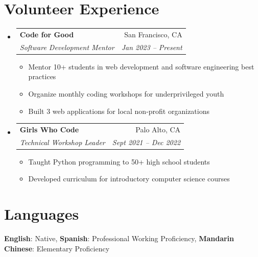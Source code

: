 \documentclass[letterpaper,11pt]{article}
\makeatletter
\newcommand{\resumeItem}[1]{
  \item\small{
    {#1 \vspace{-2pt}}
  }
}
\newcommand{\resumeSubheading}[4]{
  \vspace{-2pt}\item
    \begin{tabular*}{0.97\textwidth}[t]{l@{\extracolsep{\fill}}r}
      \textbf{#1} & #2 \\
      \textit{\small#3} & \textit{\small #4} \\
    \end{tabular*}\vspace{-7pt}
}
\newcommand{\resumeSubHeadingListStart}{\begin{itemize}[leftmargin=0.15in, label={}]}
\newcommand{\resumeSubHeadingListEnd}{\end{itemize}}
\newcommand{\resumeItemListStart}{\begin{itemize}}
\newcommand{\resumeItemListEnd}{\end{itemize}\vspace{-5pt}}
\makeatother
\begin{document}
\section{Volunteer Experience}
  \resumeSubHeadingListStart
    \resumeSubheading
      {Code for Good}{San Francisco, CA}
      {Software Development Mentor}{Jan 2023 -- Present}
      \resumeItemListStart
        \resumeItem{Mentor 10+ students in web development and software engineering best practices}
        \resumeItem{Organize monthly coding workshops for underprivileged youth}
        \resumeItem{Built 3 web applications for local non-profit organizations}
      \resumeItemListEnd
    \resumeSubheading
      {Girls Who Code}{Palo Alto, CA}
      {Technical Workshop Leader}{Sept 2021 -- Dec 2022}
      \resumeItemListStart
        \resumeItem{Taught Python programming to 50+ high school students}
        \resumeItem{Developed curriculum for introductory computer science courses}
      \resumeItemListEnd
  \resumeSubHeadingListEnd


\section{Languages}
 \begin{itemize}[leftmargin=0.15in, label={}]
    \small{\item{
    \resumeItem{\textbf{English}: Native, \textbf{Spanish}: Professional Working Proficiency, \textbf{Mandarin Chinese}: Elementary Proficiency}
    }}
 \end{itemize}


\end{document}
